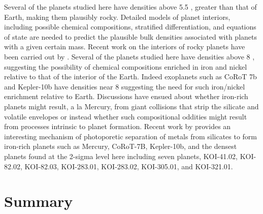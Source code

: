 \documentclass{emulateapj}
\begin{document}
Several of the planets studied here have densities above 5.5 \gcc, greater than that of Earth, making them plausibly rocky.  Detailed models of planet interiors, including possible chemical compositions, stratified differentiation, and equations of state are needed to predict the plausible bulk densities associated with planets with a given certain mass.   Recent work on the interiors of rocky planets have been carried out by \cite{Rogers_Seager2010a, Rogers_Seager2010b, Rogers2011, Zeng_Sasselov2013, Rogers2013}.  Several of the planets studied here have densities above 8 \gcc, suggesting the possibility of chemical compositions enriched in iron and nickel relative to that of the interior of the Earth.  Indeed exoplanets such as CoRoT 7b and Kepler-10b have densities near 8 \gcc suggesting the need for such iron/nickel enrichment relative to Earth.   Discussions have ensued about whether iron-rich planets might result, a la Mercury, from giant collisions that strip the silicate and volatile envelopes or instead whether such compositional oddities might result from processes intrinsic to planet formation.  Recent work by \cite{Wurm2013} provides an interesting mechanism of  photoporetic separation of metals from silicates to form iron-rich planets such as Mercury, CoRoT-7B, Kepler-10b, and the densest planets found at the 2-sigma level here including seven planets, KOI-41.02, KOI-82.02, KOI-82.03, KOI-283.01, KOI-283.02, KOI-305.01, and KOI-321.01.



\section{Summary}           %
\label{sec:summary}
\end{document}
